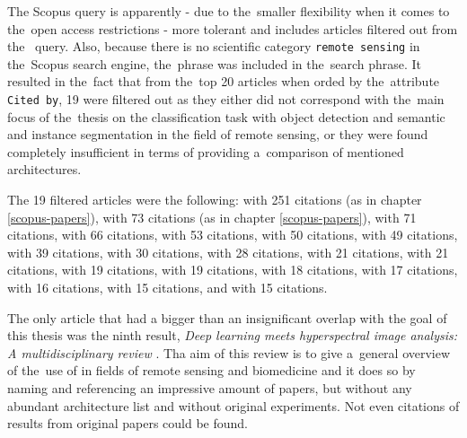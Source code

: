 The Scopus query is apparently - due to the~smaller flexibility when it comes to the~open access restrictions - more tolerant and includes articles filtered out from the~ query. Also, because there is no scientific category \verb|remote sensing| in the~Scopus search engine, the~phrase was included in the~search phrase. It resulted in the~fact that from the~top 20 articles when orded by the~attribute \verb|Cited by|, 19 were filtered out as they either did not correspond with the~main focus of the~thesis on the classification task with object detection and semantic and instance segmentation in the field of remote sensing, or they were found completely insufficient in terms of providing a~comparison of mentioned architectures.

The 19 filtered articles were the following: \cite{dl-for-cv} with 251 citations (as in chapter \ref{scopus-papers}), \cite{state-of-the-art-dl} with 73 citations (as in chapter \ref{scopus-papers}), \cite{review-water-dl} with 71 citations, \cite{review-plant-stress} with 66 citations, \cite{review-text-class} with 53 citations, \cite{review-oil-spill} with 50 citations, \cite{review-cv-infra-inspections} with 49 citations, \cite{review-vessel-detection} with 39 citations, \cite{review-ml-smart-grid} with 30 citations, \cite{review-autonomus-vehicles} with 28 citations, \cite{review-grasp} with 21 citations, \cite{review-3d-human-interaction} with 21 citations, \cite{review-dl-3d-classification} with 19 citations, \cite{review-crop-phenomics} with 19 citations, \cite{review-age-estimation} with 18 citations, \cite{review-shot-boundary} with 17 citations, \cite{review-crop-phenomics-breeding} with 16 citations, \cite{review-video-crowd} with 15 citations, and \cite{review-dl-food} with 15 citations.

The only article that had a bigger than an insignificant overlap with the goal of this thesis was the ninth result, \textit{Deep learning meets hyperspectral image analysis: A multidisciplinary review} \cite{review-dl-hs-rs-bio}. Tha aim of this review is to give a~general overview of the~use of  in fields of remote sensing and biomedicine and it does so by naming and referencing an impressive amount of papers, but without any abundant architecture list and without original experiments. Not even citations of results from original papers could be found.
